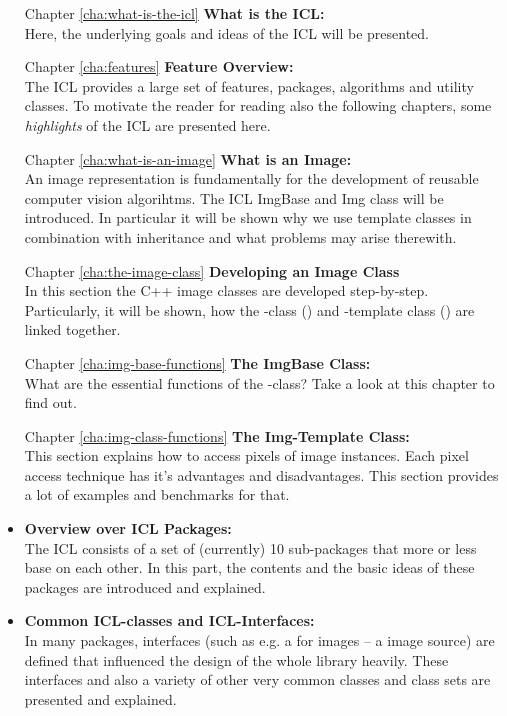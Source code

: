 \begin{itemize}
\item [Chapter \ref{cha:what-is-the-icl}] \textbf{What is the ICL:}\\ Here, the underlying goals and ideas of the ICL will be presented.
\item [Chapter \ref{cha:features}] \textbf{Feature Overview:}\\ The ICL provides a large set of features, packages, algorithms and utility classes. To motivate the reader for reading also the following chapters, some \emph{highlights} of the ICL are presented here.
\item [Chapter \ref{cha:what-is-an-image}] \textbf{What is an Image:}\\ An image representation is fundamentally for the development of reusable computer vision algorihtms. The ICL ImgBase  and Img  class will be introduced. In particular it will be shown why we use template classes in combination with inheritance and what problems may arise therewith. 
\item [Chapter \ref{cha:the-image-class}]\textbf{Developing an Image Class}\\
In this section the C++ image classes are developed step-by-step. Particularly, it will be shown, how the -class () and -template class () are linked together. 
\item [Chapter \ref{cha:img-base-functions}]\textbf{The ImgBase Class:}\\
What are the essential functions of the -class? Take a look at this chapter to find out.
\item [Chapter \ref{cha:img-class-functions}]\textbf{The Img-Template Class:}\\
This section explains how to access pixels of image instances. Each pixel access technique has it's advantages and disadvantages. This section provides a lot of examples and benchmarks for that.
\item \textbf{Overview over ICL Packages:}\\ The ICL consists of a set of (currently) 10 sub-packages that more or less base on each other. In this part, the contents and the basic ideas of these packages are introduced and explained. 
\item \textbf{Common ICL-classes and ICL-Interfaces:}\\ In many packages, interfaces (such as e.g. a  for images -- a image source) are defined that influenced the design of the whole library heavily. These interfaces and also a variety of other very common classes and class sets are presented and explained.

\end{itemize}
